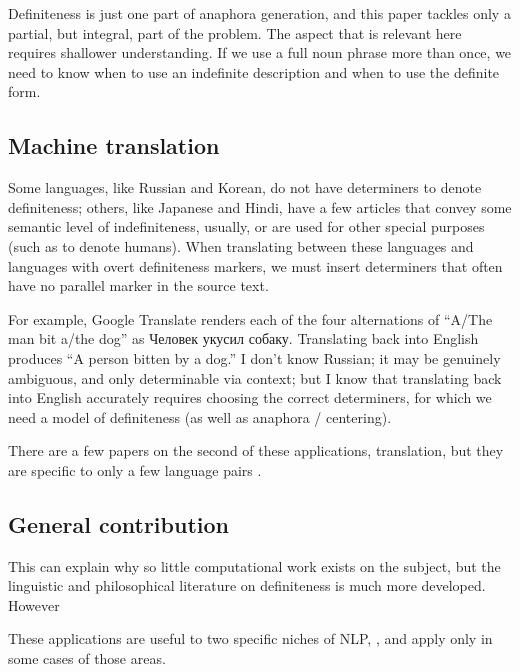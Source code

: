 \documentclass[11pt]{article}
\begin{document}
Definiteness is just one part of anaphora generation, and this paper tackles only a partial, but integral, part of the problem. The aspect that is relevant here requires shallower understanding. If we use a full noun phrase more than once, we need to know when to use an indefinite description and when to use the definite form.



\subsection{Machine translation}

Some languages, like Russian and Korean, do not have determiners to denote definiteness; others, like Japanese and Hindi, have a few articles that convey some semantic level of indefiniteness, usually, or are used for other special purposes (such as to denote humans). %
When translating between these languages and languages with overt definiteness markers, we must insert determiners that often have no parallel marker in the source text.

For example, Google Translate renders each of the four alternations of ``A/The man bit a/the dog'' as \foreignlanguage{russian}{Человек укусил собаку.} Translating back into English produces ``A person bitten by a dog.'' I don't know Russian; it may be genuinely ambiguous, and only determinable via context; but I know that translating back into English accurately requires choosing the correct determiners, for which we need a model of definiteness (as well as anaphora / centering).




\noindent
There are a few papers on the second of these applications, translation, but they are specific to only a few language pairs \citep{ishikawa:1995, siegel:1996}.

\subsection{General contribution}
This can explain why so little computational work exists on the subject, but the linguistic and philosophical literature on definiteness is much more developed.
However

These applications are useful to two specific niches of NLP, , and apply only in some cases of those areas.


\end{document}

